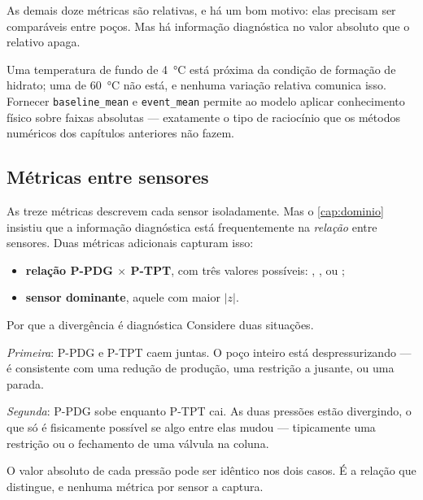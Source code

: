\begin{destaque}
As demais doze métricas são relativas, e há um bom motivo: elas precisam ser comparáveis
entre poços. Mas há informação diagnóstica no valor absoluto que o relativo apaga.

Uma temperatura de fundo de \SI{4}{\celsius} está próxima da condição de formação de
hidrato; uma de \SI{60}{\celsius} não está, e nenhuma variação relativa comunica isso.
Fornecer \texttt{baseline\_mean} e \texttt{event\_mean} permite ao modelo aplicar
conhecimento físico sobre faixas absolutas --- exatamente o tipo de raciocínio que os
métodos numéricos dos capítulos anteriores não fazem.
\end{destaque}

\subsection{Métricas entre sensores}

As treze métricas descrevem cada sensor isoladamente. Mas o \cref{cap:dominio} insistiu
que a informação diagnóstica está frequentemente na \emph{relação} entre sensores. Duas
métricas adicionais capturam isso:

\begin{itemize}[leftmargin=*,itemsep=0.3em]
  \item \textbf{relação P-PDG $\times$ P-TPT}, com três valores possíveis:
        , , ou
        ;
  \item \textbf{sensor dominante}, aquele com maior $|z|$.
\end{itemize}

\begin{exemplo}{Por que a divergência é diagnóstica}
Considere duas situações.

\emph{Primeira}: P-PDG e P-TPT caem juntas. O poço inteiro está despressurizando --- é
consistente com uma redução de produção, uma restrição a jusante, ou uma parada.

\emph{Segunda}: P-PDG sobe enquanto P-TPT cai. As duas pressões estão divergindo, o que
só é fisicamente possível se algo entre elas mudou --- tipicamente uma restrição ou o
fechamento de uma válvula na coluna.

O valor absoluto de cada pressão pode ser idêntico nos dois casos. É a relação que
distingue, e nenhuma métrica por sensor a captura.
\end{exemplo}

